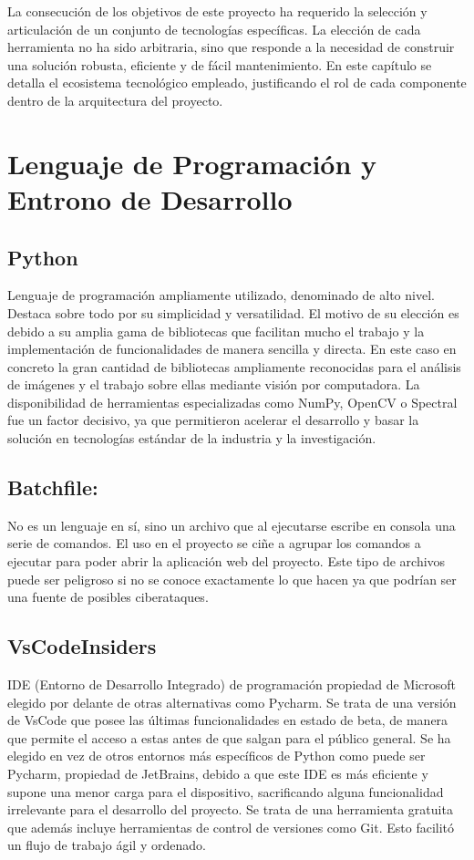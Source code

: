 
La consecución de los objetivos de este proyecto ha requerido la selección y articulación de un conjunto de tecnologías específicas. La elección de cada herramienta no ha sido arbitraria, sino que responde a la necesidad de construir una solución robusta, eficiente y de fácil mantenimiento. En este capítulo se detalla el ecosistema tecnológico empleado, justificando el rol de cada componente dentro de la arquitectura del proyecto.

\section{Lenguaje de Programación y Entrono de Desarrollo}

\subsection{Python }
Lenguaje de programación ampliamente utilizado, denominado de alto nivel. Destaca sobre todo  por su simplicidad y versatilidad\cite{PythonDocs311}. El motivo de su elección es debido a su amplia gama de bibliotecas que facilitan mucho el trabajo y la implementación de funcionalidades de manera sencilla y directa. En este caso en concreto la gran cantidad de bibliotecas ampliamente reconocidas para el análisis de imágenes y el trabajo sobre ellas mediante visión por computadora. La disponibilidad de herramientas especializadas como NumPy, OpenCV o Spectral fue un factor decisivo, ya que permitieron acelerar el desarrollo y basar la solución en tecnologías estándar de la industria y la investigación.

\subsection{Batchfile:}
No es un lenguaje en sí, sino un archivo que al ejecutarse escribe en consola una serie de comandos. El uso en el proyecto se ciñe a agrupar los comandos a ejecutar para poder abrir la aplicación web del proyecto. Este tipo de archivos puede ser peligroso si no se conoce exactamente lo que hacen ya que podrían ser una fuente de posibles ciberataques.

\subsection{VsCodeInsiders}
IDE (Entorno de Desarrollo Integrado) de programación propiedad de Microsoft elegido por delante de otras alternativas como Pycharm. Se trata de una versión de VsCode\cite{VSCode2025} que posee las últimas funcionalidades en estado de beta, de manera que permite el acceso a estas antes de que salgan para el público general.  Se ha elegido en vez de otros entornos más específicos de Python como puede ser Pycharm, propiedad de JetBrains, debido a que este IDE es más eficiente y supone una menor carga para el dispositivo, sacrificando alguna funcionalidad irrelevante para el desarrollo del proyecto. Se trata de una herramienta gratuita que además incluye herramientas de control de versiones como Git. Esto facilitó un flujo de trabajo ágil y ordenado.



